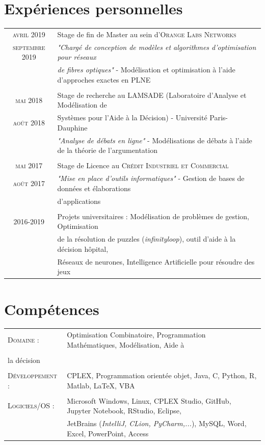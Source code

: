 \documentclass[a4paper,10pt]{article}
\begin{document}
\section{Expériences personnelles}
\begin{tabular}{c|l}	
 \textsc{avril} 2019 & Stage de fin de Master au sein d’\textsc{Orange Labs Networks} \\ 
 \textsc{septembre} 2019 & \emph{"Chargé de conception de modèles et algorithmes d'optimisation pour réseaux}\\
 & \emph{de fibres optiques"}\small{ - Modélisation et optimisation à l'aide d'approches exactes en PLNE}\\\multicolumn{2}{c}{} \\
 \textsc{mai} 2018 & Stage de recherche au \textsc{LAMSADE} (Laboratoire d'Analyse et Modélisation de\\  \textsc{août} 2018 & Systèmes pour l'Aide à la Décision) - Université Paris-Dauphine\\
  & \emph{"Analyse de débats en ligne"}\small{ - Modélisations de débats à l'aide de la théorie de l'argumentation}\\\multicolumn{2}{c}{} \\
 \textsc{mai} 2017 & Stage de Licence au \textsc{Crédit Industriel et Commercial}\\
 \textsc{août} 2017 & \emph{"Mise en place d'outils informatiques"}\small{ - Gestion de bases de données et élaborations} \\ &  \small{d'applications}\\\multicolumn{2}{c}{} \\
 2016-2019 & Projets universitaires : Modélisation de problèmes de gestion, Optimisation\\ & de la résolution de puzzles (\emph{infinityloop}), outil d'aide à la décision hôpital,\\ &  Réseaux de neurones, Intelligence Artificielle pour résoudre des jeux
\end{tabular}

\section{Compétences}

\begin{tabular}{l p{15cm}}	
\textsc{Domaine :}    &   Optimisation Combinatoire, Programmation Mathématiques, Modélisation, Aide à \\&\\la décision\\&\\
\textsc{Développement :} & CPLEX, Programmation orientée objet, Java, C, Python, R, Matlab, \LaTeX, VBA\\&\\
\textsc{Logiciels/OS :}&  Microsoft Windows, Linux, CPLEX  Studio, GitHub, Jupyter Notebook, RStudio, Eclipse, \\
     &                    JetBrains (\emph{IntelliJ, CLion, PyCharm,...}), MySQL, Word, Excel, PowerPoint, Access
\end{tabular}
\end{document}
